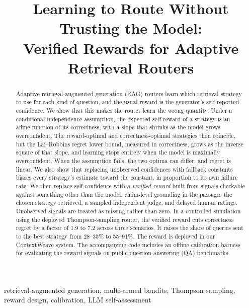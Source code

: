 \documentclass[conference]{IEEEtran}
\theoremstyle{definition}
\theoremstyle{remark}
\begin{document}
\title{Learning to Route Without Trusting the Model:\\ Verified Rewards for Adaptive Retrieval Routers}

\author{
}

\maketitle

\begin{abstract}
Adaptive retrieval-augmented generation (RAG) routers learn which retrieval strategy to use for each kind of question, and the usual reward is the generator's self-reported confidence. We show that this makes the router learn the wrong quantity. Under a conditional-independence assumption, the expected self-reward of a strategy is an affine function of its correctness, with a slope that shrinks as the model grows overconfident. The reward-optimal and correctness-optimal strategies then coincide, but the Lai--Robbins regret lower bound, measured in correctness, grows as the inverse square of that slope, and learning stops entirely when the model is maximally overconfident. When the assumption fails, the two optima can differ, and regret is linear. We also show that replacing unobserved confidences with fallback constants biases every strategy's estimate toward the constant, in proportion to its own failure rate. We then replace self-confidence with a \emph{verified reward} built from signals checkable against something other than the model: claim-level grounding in the passages the chosen strategy retrieved, a sampled independent judge, and delayed human ratings. Unobserved signals are treated as missing rather than zero. In a controlled simulation using the deployed Thompson-sampling router, the verified reward cuts correctness regret by a factor of 1.9 to 7.2 across three scenarios. It raises the share of queries sent to the best strategy from 28--35\% to 55--91\%. The reward is deployed in our ContextWeave system. The accompanying code includes an offline calibration harness for evaluating the reward signals on public question-answering (QA) benchmarks.
\end{abstract}

\begin{IEEEkeywords}
retrieval-augmented generation, multi-armed bandits, Thompson sampling, reward design, calibration, LLM self-assessment
\end{IEEEkeywords}
\end{document}
